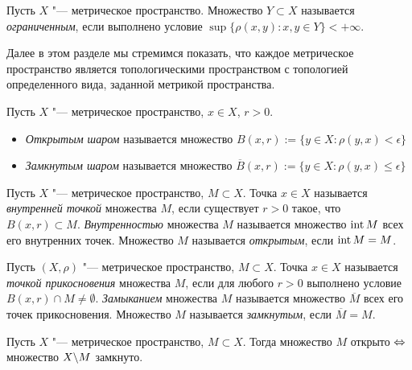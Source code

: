 \begin{definition}
	Пусть $X$ "--- метрическое пространство. Множество $Y \subset X$ называется \textit{ограниченным}, если выполнено условие $\sup\{\rho(x, y): x, y \in Y\} < +\infty$.
\end{definition}

\begin{note}
	Далее в этом разделе мы стремимся показать, что каждое метрическое пространство является топологическими пространством с топологией определенного вида, заданной метрикой пространства.
\end{note}

\begin{definition}
	Пусть $X$ "--- метрическое пространство, $x \in X$, $r > 0$.
	\begin{itemize}
		\item \textit{Открытым шаром} называется множество $B(x, r) := \{y \in X: \rho(y, x) < \epsilon\}$
		
		\item \textit{Замкнутым шаром} называется множество $\overline B(x, r) := \{y \in X: \rho(y, x) \le \epsilon\}$
	\end{itemize}
\end{definition}

\begin{definition}
	Пусть $X$ "--- метрическое пространство, $M \subset X$. Точка $x \in X$ назы\-вается \textit{внутренней точкой} множества $M$, если существует $r > 0$ такое, что $B(x, r) \subset M$. \textit{Внутренностью} множества $M$ называется множество $\operatorname{int}{M}$ всех его внутренних точек. Множество $M$ называется \textit{открытым}, если $\operatorname{int}{M} = M$.
\end{definition}

\begin{definition}
	Пусть $(X, \rho)$ "--- метрическое пространство, $M \subset X$. Точка $x \in X$ назы\-вается \textit{точкой прикосновения} множества $M$, если для любого $r > 0$ выполнено условие $B(x, r) \cap M \ne \emptyset$. \textit{Замыканием} множества $M$ называется множество $\overline M$ всех его точек прикосновения. Множество $M$ называется \textit{замкнутым}, если $\overline M = M$.
\end{definition}

\begin{theorem}\label{thm1.1}
	Пусть $X$ "--- метрическое пространство, $M \subset X$. Тогда множество $M$ открыто $\Leftrightarrow$ множество $X \backslash M$ замкнуто.
\end{theorem}

